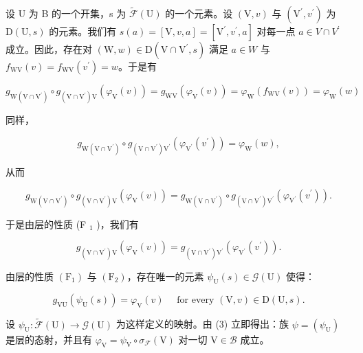 设 U 为 B 的一个开集，s 为 \(\widetilde{\mathcal{F}}(\mathrm{U})\) 的一个元素。设 \((\mathrm{V},v)\) 与 \((\mathrm{V}^{\prime},v^{\prime})\) 为 \(\mathrm{D}(\mathrm{U},s)\) 的元素。我们有 \(s(a)=[\mathrm{V},v,a]=[\mathrm{V}^{\prime},v^{\prime},a]\) 对每一点 \(a\in V\cap V^{\prime}\) 成立。因此，存在对 \((\mathrm{W},w)\in\mathrm{D}(\mathrm{V}\cap\mathrm{V}^{\prime},s)\) 满足 \(a\in W\) 与 \(f_{\mathrm{WV}}(v)=f_{\mathrm{WV}}(v^{\prime})=w\)。于是有

\[
g _ {\mathrm{W} (\mathrm{V} \cap \mathrm{V} ^ {\prime})} \circ g _ {(\mathrm{V} \cap \mathrm{V} ^ {\prime}) \mathrm{V}} (\varphi_ {\mathrm{V}} (v)) = g _ {\mathrm{WV}} (\varphi_ {\mathrm{V}} (v)) = \varphi_ {\mathrm{W}} (f _ {\mathrm{WV}} (v)) = \varphi_ {\mathrm{W}} (w)
\]

同样，

\[
g _ {\mathrm{W} (\mathrm{V} \cap \mathrm{V} ^ {\prime})} \circ g _ {(\mathrm{V} \cap \mathrm{V} ^ {\prime}) \mathrm{V} ^ {\prime}} (\varphi_ {\mathrm{V} ^ {\prime}} (v ^ {\prime})) = \varphi_ {\mathrm{W}} (w),
\]

从而

\[
g _ {\mathrm{W} (\mathrm{V} \cap \mathrm{V} ^ {\prime})} \circ g _ {(\mathrm{V} \cap \mathrm{V} ^ {\prime}) \mathrm{V}} (\varphi_ {\mathrm{V}} (v)) = g _ {\mathrm{W} (\mathrm{V} \cap \mathrm{V} ^ {\prime})} \circ g _ {(\mathrm{V} \cap \mathrm{V} ^ {\prime}) \mathrm{V} ^ {\prime}} (\varphi_ {\mathrm{V} ^ {\prime}} (v ^ {\prime})).
\]

于是由层的性质 (F \(_{1}\) )，我们有

\[
g _ {(\mathrm{V} \cap \mathrm{V} ^ {\prime}) \mathrm{V}} (\varphi_ {\mathrm{V}} (v)) = g _ {(\mathrm{V} \cap \mathrm{V} ^ {\prime}) \mathrm{V} ^ {\prime}} (\varphi_ {\mathrm{V} ^ {\prime}} (v ^ {\prime})).
\]

由层的性质 \((\mathrm{F}_{1})\) 与 \((\mathrm{F}_{2})\)，存在唯一的元素 \(\psi_{\mathrm{U}}(s) \in \mathcal{G}(\mathrm{U})\) 使得：

\[
g _ {\mathrm{VU}} \left(\psi_ {\mathrm{U}} (s)\right) = \varphi_ {\mathrm{V}} (v) \quad \text {   for   every   } (\mathrm{V}, v) \in \mathrm{D} (\mathrm{U}, s).\tag{3}
\]

设 \(\psi_{\mathrm{U}}\colon \widetilde{\mathcal{F}} (\mathrm{U})\to \mathcal{G}(\mathrm{U})\) 为这样定义的映射。由 (3) 立即得出：族 \(\psi = (\psi_{\mathrm{U}})\) 是层的态射，并且有 \(\varphi_{\mathrm{V}} = \psi_{\mathrm{V}}\circ \sigma_{\mathcal{F}}(\mathrm{V})\) 对一切 \(\mathrm{V}\in \mathcal{B}\) 成立。

